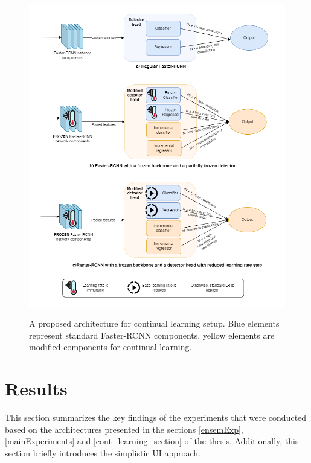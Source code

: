 \documentclass[english, 12pt, a4paper, elec, utf8, a-1b, online]{aaltothesis}
\begin{document}
\begin{figure}[htb]
	\begin{center}
		\includegraphics[width=16cm]{./FC.png}
	\end{center}
	\caption{A proposed architecture for continual learning setup. Blue elements represent standard Faster-RCNN components, yellow elements are modified components for continual learning.}
	\begin{center}
		\label{continualModel}
	\end{center}
\end{figure}
\FloatBarrier


\clearpage

\section{Results} 
\label{results} 
This section summarizes the key findings of the experiments that were conducted based on the architectures presented in the sections \ref{ensemExp},  \ref{mainExperiments} and \ref{cont_learning_section} of the thesis. Additionally, this section briefly introduces the simplistic UI approach. 
\end{document}
